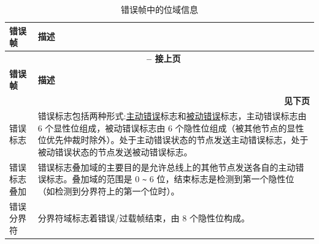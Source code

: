 \begin{longtable}[c]{|p{2.5cm}|p{13cm}|} 
    
  \caption{错误帧中的位域信息}
  \label{tab:twai-error-frame} 
  \\\hline
  \rowcolor{lightgray}
  \textbf{错误帧} & \textbf{描述}
  \\\hline
  \endfirsthead
  
  \multicolumn{2}{c}{\bfseries \tablename\ \thetable{} -- 接上页}\\  \hline
  
  \rowcolor{lightgray}
    \textbf{错误帧} & \textbf{描述}
  \\\hline
  \endhead
  
  \multicolumn{2}{r}{\textbf{见下页}} \\
  \endfoot
  \endlastfoot
  

    错误标志 & 错误标志包括两种形式:\hyperref[table_item:active_err]{主动错误}标志和\hyperref[table_item:passive_err]{被动错误}标志，主动错误标志由 6 个显性位组成，被动错误标志由 6 个隐性位组成（被其他节点的显性位优先仲裁时除外）。处于主动错误状态的节点发送主动错误标志，处于被动错误状态的节点发送被动错误标志。
          \\\hline
    错误标志叠加 & 错误标志叠加域的主要目的是允许总线上的其他节点发送各自的主动错误标志。叠加域的范围是 0 \verb+~+ 6 位，结束标志是检测到第一个隐性位（如检测到分界符上的第一个位时）。                               
           \\\hline
    错误分界符 & 分界符域标志着错误/过载帧结束，由 8 个隐性位构成。                                                   \\\hline
\end{longtable}